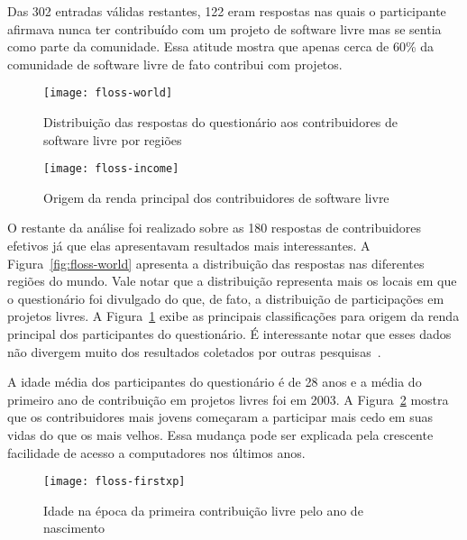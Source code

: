 Das 302 entradas válidas restantes, 122 eram respostas nas quais o
participante afirmava nunca ter contribuído com um projeto de software
livre mas se sentia como parte da comunidade. Essa atitude mostra que
apenas cerca de 60\% da comunidade de software livre de fato contribui
com projetos.


\begin{figure}[hbt]
  \begin{minipage}[t]{0.5\linewidth}
    \centering
    \texttt{[image: floss-world]}
    \caption{Distribuição das respostas do questionário aos
      contribuidores de software livre por regiões}
    \label{fig:floss-world}
  \end{minipage}
  \begin{minipage}[t]{0.5\linewidth}
    \centering
    \texttt{[image: floss-income]}
    \caption{Origem da renda principal dos contribuidores de software
      livre}
    \label{fig:floss-income}
  \end{minipage}
\end{figure}

O restante da análise foi realizado sobre as 180 respostas de
contribuidores efetivos já que elas apresentavam resultados mais
interessantes. A Figura~\ref{fig:floss-world} apresenta a distribuição
das respostas nas diferentes regiões do mundo. Vale notar que a
distribuição representa mais os locais em que o questionário foi
divulgado do que, de fato, a distribuição de participações em projetos
livres. A Figura~\ref{fig:floss-income} exibe as principais
classificações para origem da renda principal dos participantes do
questionário. É interessante notar que esses dados não divergem muito
dos resultados coletados por outras pesquisas~\cite{FlossStats}.

A idade média dos participantes do questionário é de 28 anos e a média
do primeiro ano de contribuição em projetos livres foi em 2003. A
Figura~\ref{fig:floss-firstxp} mostra que os contribuidores mais
jovens começaram a participar mais cedo em suas vidas do que os mais
velhos. Essa mudança pode ser explicada pela crescente facilidade de
acesso a computadores nos últimos anos.


\begin{figure}
  \centering
  \texttt{[image: floss-firstxp]}
  \caption{Idade na época da primeira contribuição livre pelo ano de
    nascimento}
  \label{fig:floss-firstxp}
\end{figure}

